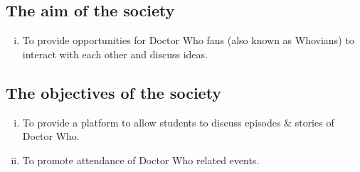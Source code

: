 \subsection{The aim of the society}
\begin{enumerate}[i.]
    \item To provide opportunities for Doctor Who fans (also known as Whovians) to interact with each other and discuss ideas.
\end{enumerate}

\subsection{The objectives of the society}
\begin{enumerate}[i.]
    \item To provide a platform to allow students to discuss episodes \& stories of Doctor Who.
    \item To promote attendance of Doctor Who related events.
\end{enumerate}